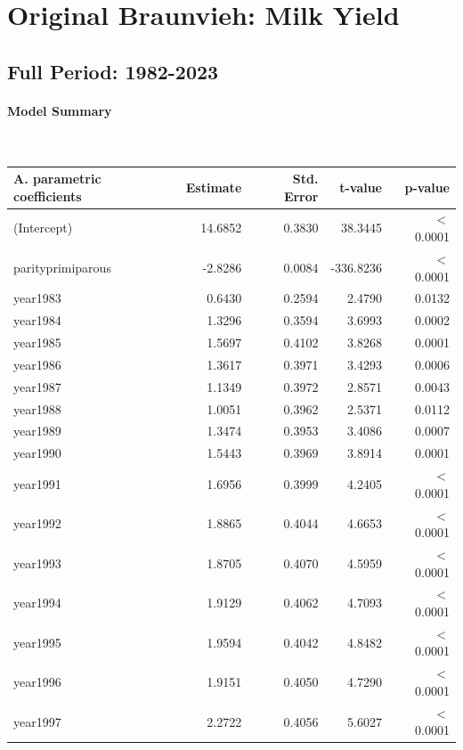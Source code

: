 \section{Original Braunvieh: Milk Yield}
\subsection{Full Period: 1982-2023}\label{model:ob_milk_full}
\paragraph{Model Summary} \quad \\


    \begin{table}[H]
    \centering
    \begin{tabular}{lrrrr}
    \textbf{A. parametric coefficients} & Estimate & Std. Error & t-value & p-value \\ 
       \hline
       \hline
      (Intercept) & 14.6852 & 0.3830 & 38.3445 & $<$ 0.0001 \\ 
      parityprimiparous & -2.8286 & 0.0084 & -336.8236 & $<$ 0.0001 \\ 
      year1983 & 0.6430 & 0.2594 & 2.4790 & 0.0132 \\ 
      year1984 & 1.3296 & 0.3594 & 3.6993 & 0.0002 \\ 
      year1985 & 1.5697 & 0.4102 & 3.8268 & 0.0001 \\ 
      year1986 & 1.3617 & 0.3971 & 3.4293 & 0.0006 \\ 
      year1987 & 1.1349 & 0.3972 & 2.8571 & 0.0043 \\ 
      year1988 & 1.0051 & 0.3962 & 2.5371 & 0.0112 \\ 
      year1989 & 1.3474 & 0.3953 & 3.4086 & 0.0007 \\ 
      year1990 & 1.5443 & 0.3969 & 3.8914 & 0.0001 \\ 
      year1991 & 1.6956 & 0.3999 & 4.2405 & $<$ 0.0001 \\ 
      year1992 & 1.8865 & 0.4044 & 4.6653 & $<$ 0.0001 \\ 
      year1993 & 1.8705 & 0.4070 & 4.5959 & $<$ 0.0001 \\ 
      year1994 & 1.9129 & 0.4062 & 4.7093 & $<$ 0.0001 \\ 
      year1995 & 1.9594 & 0.4042 & 4.8482 & $<$ 0.0001 \\ 
      year1996 & 1.9151 & 0.4050 & 4.7290 & $<$ 0.0001 \\ 
      year1997 & 2.2722 & 0.4056 & 5.6027 & $<$ 0.0001 \\ 

\end{tabular}
\end{table}
